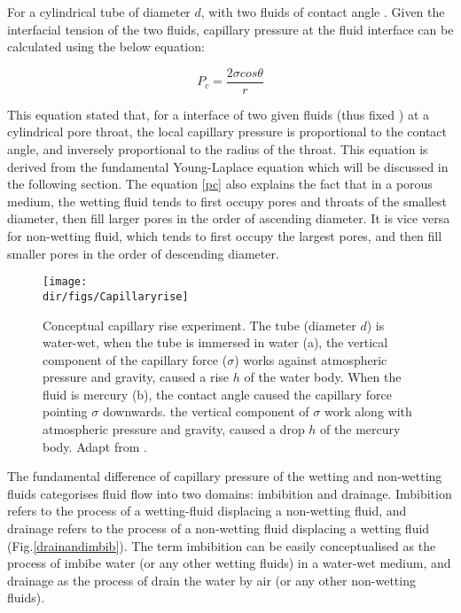 For a cylindrical tube of diameter $d$, with two fluids of contact angle \texttheta. Given the interfacial tension \textsigma of the two fluids, capillary pressure at the fluid interface can be calculated using the below equation:

\begin{equation}\label{pc}
    P_c=\frac{2\sigma cos \theta}{r}
\end{equation}

This equation stated that, for a interface of two given fluids (thus fixed \textsigma) at a cylindrical pore throat, the local capillary pressure is proportional to the contact angle, and inversely proportional to the radius of the throat. This equation is derived from the fundamental Young-Laplace equation which will be discussed in the following section. The equation \ref{pc} also explains the fact that in a porous medium, the wetting fluid tends to first occupy pores and throats of the smallest diameter, then fill larger pores in the order of ascending diameter. It is vice versa for non-wetting fluid, which tends to first occupy the largest pores, and then fill smaller pores in the order of descending diameter.

\begin{figure}[htbp]
  \centering
  \texttt{[image: \\dir/figs/Capillaryrise]}
  \caption{Conceptual capillary rise experiment. The tube (diameter $d$) is water-wet, when the tube is immersed in water (a), the vertical component of the capillary force ($\sigma$) works against atmospheric pressure and gravity, caused a rise $h$ of the water body. When the fluid is mercury (b), the contact angle caused the capillary force pointing $\sigma$ downwards. the vertical component of $\sigma$ work along with atmospheric pressure and gravity, caused a drop $h$ of the mercury body. Adapt from \citet{kerimov2014middle}.}
  \label{capillaryrise}
\end{figure}

The fundamental difference of capillary pressure of the wetting and non-wetting fluids categorises fluid flow into two domains: imbibition and drainage. Imbibition refers to the process of a wetting-fluid displacing a non-wetting fluid, and drainage refers to the process of a non-wetting fluid displacing a wetting fluid (Fig.\ref{drainandimbib}). The term imbibition can be easily conceptualised as the process of imbibe water (or any other wetting fluids) in a water-wet medium, and drainage as the process of drain the water by air (or any other non-wetting fluids).

